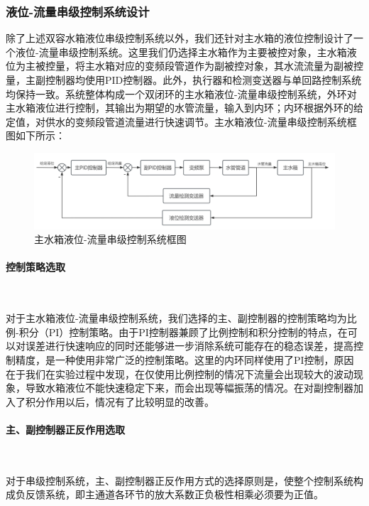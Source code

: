 \documentclass[UTF8]{article}
\begin{document}
\subsubsection{液位-流量串级控制系统设计}
除了上述双容水箱液位串级控制系统以外，我们还针对主水箱的液位控制设计了一个液位-流量串级控制系统。这里我们仍选择主水箱作为主要被控对象，主水箱液位为主被控量，将主水箱对应的变频段管道作为副被控对象，其水流流量为副被控量，主副控制器均使用PID控制器。此外，执行器和检测变送器与单回路控制系统均保持一致。系统整体构成一个双闭环的主水箱液位-流量串级控制系统，外环对主水箱液位进行控制，其输出为期望的水管流量，输入到内环；内环根据外环的给定值，对供水的变频段管道流量进行快速调节。主水箱液位-流量串级控制系统框图如下所示：
\begin{figure}[H]
    \centering %
    \includegraphics[width=1\textwidth]{figure/主水箱液位-流量串级控制系统框图.png} 
    \caption{主水箱液位-流量串级控制系统框图} %
\end{figure}

\paragraph{控制策略选取}~{}

对于主水箱液位-流量串级控制系统，我们选择的主、副控制器的控制策略均为比例-积分（PI）控制策略。由于PI控制器兼顾了比例控制和积分控制的特点，在可以对误差进行快速响应的同时还能够进一步消除系统可能存在的稳态误差，提高控制精度，是一种使用非常广泛的控制策略。这里的内环同样使用了PI控制，原因在于我们在实验过程中发现，在仅使用比例控制的情况下流量会出现较大的波动现象，导致水箱液位不能快速稳定下来，而会出现等幅振荡的情况。在对副控制器加入了积分作用以后，情况有了比较明显的改善。

\paragraph{主、副控制器正反作用选取}~{}

对于串级控制系统，主、副控制器正反作用方式的选择原则是，使整个控制系统构成负反馈系统，即主通道各环节的放大系数正负极性相乘必须要为正值。
\end{document}
